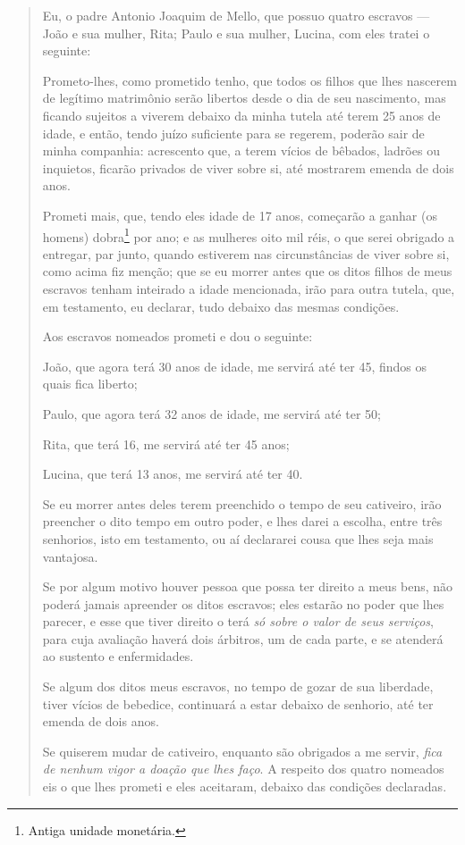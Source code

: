 \begin{quote}
Eu, o padre Antonio Joaquim de Mello, que possuo quatro escravos ---
João e sua mulher, Rita; Paulo e sua mulher, Lucina, com eles tratei o
seguinte:

Prometo-lhes, como prometido tenho, que todos os filhos que lhes
nascerem de legítimo matrimônio serão libertos desde o dia de seu
nascimento, mas ficando sujeitos a viverem debaixo da minha tutela até
terem 25 anos de idade, e então, tendo juízo suficiente para se regerem,
poderão sair de minha companhia: acrescento que, a terem vícios de
bêbados, ladrões ou inquietos, ficarão privados de viver sobre si, até
mostrarem emenda de dois anos.

Prometi mais, que, tendo eles idade de 17 anos, começarão a ganhar (os
homens) dobra\footnote{Antiga unidade monetária.} por ano; e as
mulheres oito mil réis, o que serei obrigado a entregar, par junto,
quando estiverem nas circunstâncias de viver sobre si, como acima fiz
menção; que se eu morrer antes que os ditos filhos de meus escravos
tenham inteirado a idade mencionada, irão para outra tutela, que, em
testamento, eu declarar, tudo debaixo das mesmas condições.

Aos escravos nomeados prometi e dou o seguinte:

João, que agora terá 30 anos de idade, me servirá até ter 45, findos os
quais fica liberto;

Paulo, que agora terá 32 anos de idade, me servirá até ter 50;

Rita, que terá 16, me servirá até ter 45 anos;

Lucina, que terá 13 anos, me servirá até ter 40.

Se eu morrer antes deles terem preenchido o tempo de seu cativeiro, irão
preencher o dito tempo em outro poder, e lhes darei a escolha, entre
três senhorios, isto em testamento, ou aí declararei cousa que lhes seja
mais vantajosa.

Se por algum motivo houver pessoa que possa ter direito a meus bens, não
poderá jamais apreender os ditos escravos; eles estarão no poder que
lhes parecer, e esse que tiver direito o terá \emph{só sobre o valor de
seus serviços}, para cuja avaliação haverá dois árbitros, um de cada
parte, e se atenderá ao sustento e enfermidades.

Se algum dos ditos meus escravos, no tempo de gozar de sua liberdade,
tiver vícios de bebedice, continuará a estar debaixo de senhorio, até
ter emenda de dois anos.

Se quiserem mudar de cativeiro, enquanto são obrigados a me servir,
\emph{fica de nenhum vigor a doação que lhes faço}. A respeito dos
quatro nomeados eis o que lhes prometi e eles aceitaram, debaixo das
condições declaradas.


\end{quote}
